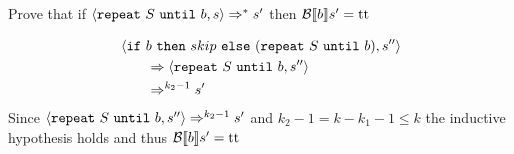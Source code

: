 \begin{exercise}{
    Prove that if $\left<\texttt{repeat}\ S\ \texttt{until}\ b, s\right> \Rightarrow^* s'$ then $\mathcal{B} \llbracket b \rrbracket s' = \text{tt}$ \vspace*{0.4cm}
}
\begin{itemize}
\begin{itemize}
                    \begin{align*}
                        &\left<\texttt{if}\ b\ \texttt{then}\ skip\ \texttt{else}\ (\texttt{repeat}\ S\ \texttt{until}\ b), s''\right>
                        \\&\qquad \Rightarrow \left<\texttt{repeat}\ S\ \texttt{until}\ b, s''\right>
                        \\&\qquad \Rightarrow^{k_2 - 1} s'
                    \end{align*}
                    Since $\left<\texttt{repeat}\ S\ \texttt{until}\ b, s''\right> \Rightarrow^{k_2 - 1} s'$ and $k_2 - 1 = k - k_1 - 1 \leq k$ the inductive hypothesis holds and thus $\mathcal{B} \llbracket b \rrbracket s' = \text{tt}$
            \end{itemize}
    \end{itemize}
\end{exercise}
